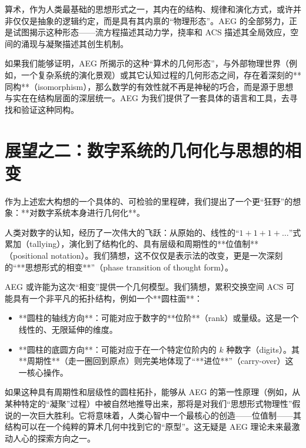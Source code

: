 \documentclass[a4paper,12pt]{book}
\numberwithin{problem}{section}
\numberwithin{definition}{section}
\numberwithin{lemma}{section}
\numberwithin{proposition}{section}
\numberwithin{theorem}{section}
\numberwithin{grammar}{section}
\numberwithin{program}{section}
\numberwithin{convention}{section}
\numberwithin{corollary}{section}
\begin{document}
算术，作为人类最基础的思想形式之一，其内在的结构、规律和演化方式，或许并非仅仅是抽象的逻辑约定，而是具有其内禀的“物理形态”。AEG 的全部努力，正是试图揭示这种形态——流方程描述其动力学，挠率和 ACS 描述其全局效应，空间的涌现与凝聚描述其创生机制。

如果我们能够证明，AEG 所揭示的这种“算术的几何形态”，与外部物理世界（例如，一个复杂系统的演化景观）或其它认知过程的几何形态之间，存在着深刻的**同构**（isomorphism），那么数学的有效性就不再是神秘的巧合，而是源于思想与实在在结构层面的深层统一。AEG 为我们提供了一套具体的语言和工具，去寻找和验证这种同构。

\section{展望之二：数字系统的几何化与思想的相变}
\label{sec:outlook_numeral_systems}

作为上述宏大构想的一个具体的、可检验的里程碑，我们提出了一个更“狂野”的想象：**对数字系统本身进行几何化**。

人类对数字的认知，经历了一次伟大的飞跃：从原始的、线性的“$1+1+1+\dots$”式累加（tallying），演化到了结构化的、具有层级和周期性的**位值制**（positional notation）。我们猜想，这不仅仅是表示法的改变，更是一次深刻的“**思想形式的相变**”（phase transition of thought form）。

AEG 或许能为这次“相变”提供一个几何模型。我们猜想，累积交换空间 ACS 可能具有一个非平凡的拓扑结构，例如一个**圆柱面**：
\begin{itemize}
    \item **圆柱的轴线方向**：可能对应于数字的**位阶**（rank）或量级。这是一个线性的、无限延伸的维度。
    \item **圆柱的底圆方向**：可能对应于在一个特定位阶内的 $k$ 种数字（digits）。其**周期性**（走一圈回到原点）则完美地体现了“**进位**”（carry-over）这一核心操作。
\end{itemize}
如果这种具有周期性和层级性的圆柱拓扑，能够从 AEG 的第一性原理（例如，从某种特定的“凝聚”过程）中被自然地推导出来，那将是对我们“思想形式物理性”假说的一次巨大胜利。它将意味着，人类心智中一个最核心的创造——位值制——其结构可以在一个纯粹的算术几何中找到它的“原型”。这无疑是 AEG 理论未来最激动人心的探索方向之一。
\end{document}
